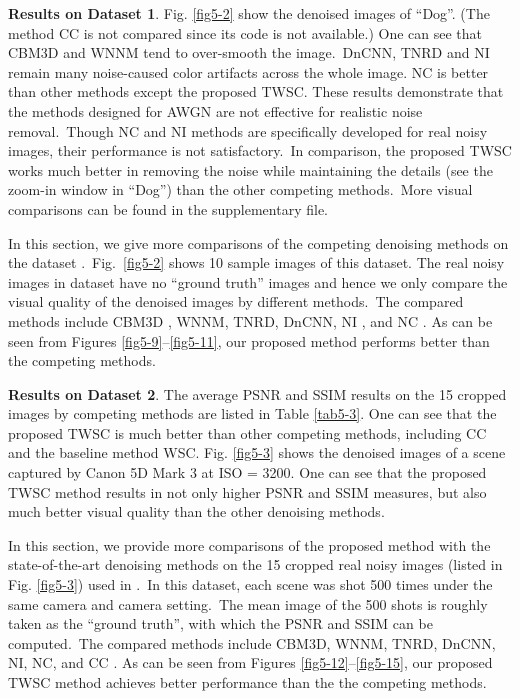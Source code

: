 \textbf{Results on Dataset 1}. Fig. \ref{fig5-2} show the denoised images of ``Dog''. (The method CC \cite{crosschannel2016} is not compared since its code is not available.) One can see that CBM3D and WNNM tend to over-smooth the image.\ DnCNN, TNRD and NI remain many noise-caused color artifacts across the whole image. NC is better than other methods except the proposed TWSC. These results demonstrate that the methods designed for AWGN are not effective for realistic noise removal.\ Though NC and NI methods are specifically developed for real noisy images, their performance is not satisfactory.\ In comparison, the proposed TWSC works much better in removing the noise while maintaining the details (see the zoom-in window in ``Dog'') than the other competing methods.\ More visual comparisons can be found in the supplementary file.

In this section, we give more comparisons of the competing denoising methods on the dataset \cite{ncwebsite}.\ Fig.\ \ref{fig5-2} shows 10 sample images of this dataset. The real noisy images in dataset \cite{ncwebsite} have no ``ground truth'' images and hence we only compare the visual quality of the denoised images by different methods.\ The compared methods include CBM3D \cite{cbm3d}, WNNM, TNRD, DnCNN, NI \cite{neatimage}, and NC \cite{noiseclinic}. As can be seen from Figures \ref{fig5-9}--\ref{fig5-11}, our proposed method performs better than the competing methods.

\textbf{Results on Dataset 2}. The average PSNR and SSIM results on the 15 cropped images by competing methods are listed in Table \ref{tab5-3}. One can see that the proposed TWSC is much better than other competing methods, including CC and the baseline method WSC. Fig. \ref{fig5-3} shows the denoised images of a scene captured by Canon 5D Mark 3 at ISO = 3200. One can see that the proposed TWSC method results in not only higher PSNR and SSIM measures, but also much better visual quality than the other denoising methods.

In this section, we provide more comparisons of the proposed method with the state-of-the-art denoising methods on the 15 cropped real noisy images (listed in Fig. \ref{fig5-3}) used in \cite{crosschannel2016}.\ In this dataset, each scene was shot 500 times under the same camera and camera setting.\ The mean image of the 500 shots is roughly taken as the ``ground truth'', with which the PSNR and SSIM \cite{ssim} can be computed.\  The compared methods include CBM3D, WNNM, TNRD, DnCNN, NI, NC, and CC \cite{crosschannel2016}. As can be seen from Figures \ref{fig5-12}--\ref{fig5-15}, our proposed TWSC method achieves better performance than the the competing methods.



